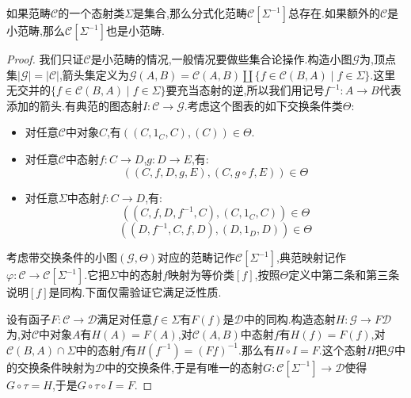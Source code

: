 如果范畴$\mathscr{C}$的一个态射类$\Sigma$是集合,那么分式化范畴$\mathscr{C}[\Sigma^{-1}]$总存在.如果额外的$\mathscr{C}$是小范畴,那么$\mathscr{C}[\Sigma^{-1}]$也是小范畴.
\begin{proof}
	
	我们只证$\mathscr{C}$是小范畴的情况,一般情况要做些集合论操作.构造小图$\mathscr{G}$为,顶点集$|\mathscr{G}|=|\mathscr{C}|$,箭头集定义为$\mathscr{G}(A,B)=\mathscr{C}(A,B)\coprod\{f\in\mathscr{C}(B,A)\mid f\in\Sigma\}$.这里无交并的$\{f\in\mathscr{C}(B,A)\mid f\in\Sigma\}$要充当态射的逆,所以我们用记号$f^{-1}:A\to B$代表添加的箭头.有典范的图态射$I:\mathscr{C}\to\mathscr{G}$.考虑这个图表的如下交换条件类$\Theta$:
	\begin{itemize}
		\item 对任意$\mathscr{C}$中对象$C$,有$\left((C,1_C,C),(C)\right)\in\Theta$.
		\item 对任意$\mathscr{C}$中态射$f:C\to D$,$g:D\to E$,有:
		$$\left((C,f,D,g,E),(C,g\circ f,E)\right)\in\Theta$$
		\item 对任意$\Sigma$中态射$f:C\to D$,有:
		$$\left((C,f,D,f^{-1},C),(C,1_C,C)\right)\in\Theta$$
		$$\left((D,f^{-1},C,f,D),(D,1_D,D)\right)\in\Theta$$
	\end{itemize}
 
    考虑带交换条件的小图$(\mathscr{G},\Theta)$对应的范畴记作$\mathscr{C}[\Sigma^{-1}]$,典范映射记作$\varphi:\mathscr{C}\to\mathscr{C}[\Sigma^{-1}]$.它把$\Sigma$中的态射$f$映射为等价类$[f]$,按照$\Theta$定义中第二条和第三条说明$[f]$是同构.下面仅需验证它满足泛性质.
    
    \qquad
    
    设有函子$F:\mathscr{C}\to\mathscr{D}$满足对任意$f\in\Sigma$有$F(f)$是$\mathscr{D}$中的同构.构造态射$H:\mathscr{G}\to F\mathscr{D}$为,对$\mathscr{C}$中对象$A$有$H(A)=F(A)$,对$\mathscr{C}(A,B)$中态射$f$有$H(f)=F(f)$,对$\mathscr{C}(B,A)\cap\Sigma$中的态射$f$有$H(f^{-1})=(Ff)^{-1}$.那么有$H\circ I=F$.这个态射$H$把$\mathscr{G}$中的交换条件映射为$\mathscr{D}$中的交换条件,于是有唯一的态射$G:\mathscr{C}[\Sigma^{-1}]\to\mathscr{D}$使得$G\circ\tau=H$,于是$G\circ\tau\circ I=F$.
\end{proof}

